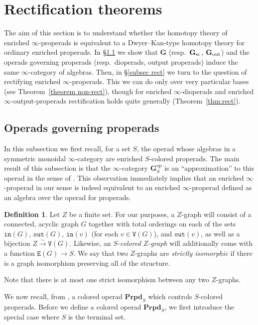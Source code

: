 \documentclass{amsart}
\numberwithin{theorem}{subsection}
\theoremstyle{definition}
\newtheorem{definition}[theorem]{Definition}
\providecommand{\op}{\mathrm{op}}
\newcommand{\isoto}{\xrightarrow{\sim}}
\newcommand{\name}[1]{\ensuremath{\text{\textup{#1}}}}
\newcommand{\bbY}{\mathbf{G}}
\newcommand{\out}{\mathtt{out}}
\newcommand{\inp}{\mathtt{in}}
\newcommand{\edge}{\mathtt{E}}
\newcommand{\vertex}{\mathtt{V}}
\newcommand{\bfproperad}{\mathbf{Prpd}}
\begin{document}
\section{Rectification theorems}\label{sec alg}
The aim of this section is to understand whether the homotopy theory of enriched $\infty$-properads is equivalent to a Dwyer--Kan-type homotopy theory for ordinary enriched properads.
In \S\ref{subsec approx} we show that $\bbY$ (resp.\ $\bbY_{\name{sc}}$, $\bbY_{\name{out}}$) and the operads governing properads (resp.\ dioperads, output properads) induce the same $\infty$-category of algebras.
Then, in \S\ref{subsec rect} we turn to the question of rectifying enriched $\infty$-properads.
This we can do only over very particular bases (see Theorem~\ref{theorem non-rect}), though for enriched $\infty$-dioperads and enriched $\infty$-output-properads rectification holds quite generally (Theorem~\ref{thm:rect}).

\subsection{Operads governing properads}\label{subsec approx}
In this subsection we first recall, for a set $S$, the operad whose algebras in a symmetric monoidal $\infty$-category are enriched $S$-colored properads.
The main result of this subsection is that the $\infty$-category $\bbY^\op_S$ is an ``approximation'' to this operad in the sense of \cite[\S 2.3.3]{ha}.
This observation immediately implies that an enriched $\infty$-properad in our sense is indeed equivalent to an enriched $\infty$-properad defined as an algebra over the operad for properads.

\begin{definition}
\label{ordered graph definition}
Let $Z$ be a finite set.
For our purposes, a $Z$-graph will consist of a connected, acyclic graph $G$ together with total orderings on each of the sets $\inp(G)$, $\out(G)$, $\inp(v)$ (for each $v\in \vertex(G)$), and $\out(v)$, as well as a bijection $Z \isoto \vertex(G)$.
Likewise, an \emph{$S$-colored $Z$-graph} will additionally come with a function $\edge(G) \to S$.
We say that two $Z$-graphs are \emph{strictly isomorphic} if there is a graph isomorphism preserving all of the structure.
\end{definition}
Note that there is at most one strict isomorphism between any two $Z$-graphs.

We now recall, from \cite[\S 14.1]{YauJohnson:FPAM}, a colored operad $\bfproperad_S$ which controls $S$-colored properads.
Before we define a colored operad $\bfproperad_S$, we first introduce the special case where $S$ is the terminal set.
\end{document}
